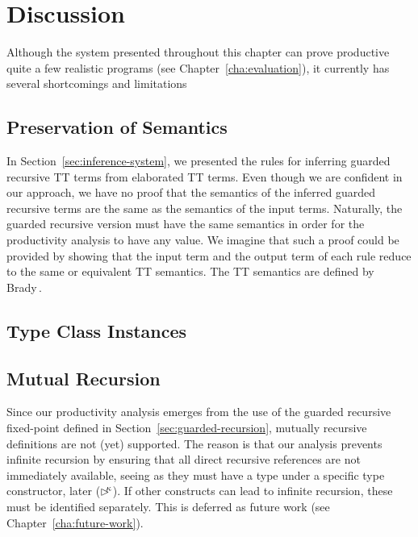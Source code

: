 \section{Discussion}
Although the system presented throughout this chapter can prove productive quite
a few realistic programs (see Chapter~\ref{cha:evaluation}), it currently has
several shortcomings and limitations

\subsection{Preservation of Semantics}
In Section~\ref{sec:inference-system}, we presented the rules for inferring
guarded recursive TT terms from elaborated TT terms. Even though we are
confident in our approach, we have no proof that the semantics of the inferred
guarded recursive terms are the same as the semantics of the input
terms. Naturally, the guarded recursive version must have the same semantics in
order for the productivity analysis to have any value. We imagine that such a
proof could be provided by showing that the input term and the output term of each
rule reduce to the same or equivalent TT semantics. The TT
semantics are defined by Brady\,\citep{BradyIdrisImpl13}.

\subsection{Type Class Instances}

\subsection{Mutual Recursion}
Since our productivity analysis emerges from the use of the guarded recursive
fixed-point defined in Section~\ref{sec:guarded-recursion}, mutually recursive
definitions are not (yet) supported. The reason is that our analysis prevents
infinite recursion by ensuring that all direct recursive references are not
immediately available, seeing as they must have a type under a specific type
constructor, later ($\rhd^{\!\!\kappa}$). If other constructs can lead to infinite
recursion, these must be identified separately. This is deferred as future work
(see Chapter~\ref{cha:future-work}).

